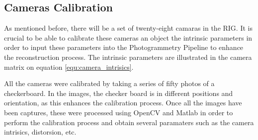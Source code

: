 \documentclass[12pt]{report}
\begin{document}
\subsection{Cameras Calibration}
As mentioned before, there will be a set of twenty-eight camaras in the RIG. 
It is crucial to be able to calibrate these cameras an object the intrinsic parameters in order to input these parameters into the Photogrammetry Pipeline to enhance
the reconstruction process. The intrinsic parameters are illustrated in the camera  matrix on equation \ref{equ:camera_intrisics}.

All  the cameras were calibrated by taking a series of fifty photos of a checkerboard. In the images, the checker board is in different positions and orientation, as this enhances the calibration process.
Once all the images have been captures, these were processed using OpenCV and Matlab in order to perform the calibration process and obtain several paramaters such as the camera intrisics, distorsion, etc.
\end{document}
